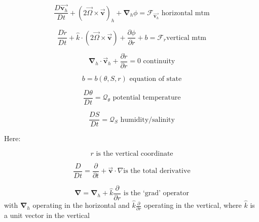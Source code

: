 

\begin{equation*}
\frac{D\vec{\mathbf{v}_{h}}}{Dt}+\left( 2\vec{\Omega}\times \vec{\mathbf{v}}
\right) _{h}+\mathbf{\nabla }_{h}\phi =\mathcal{F}_{\vec{\mathbf{v}_{h}}}
\text{ horizontal mtm} \label{eq:horizontal_mtm}
\end{equation*}

\begin{equation}
\frac{D\dot{r}}{Dt}+\widehat{k}\cdot \left( 2\vec{\Omega}\times \vec{\mathbf{
v}}\right) +\frac{\partial \phi }{\partial r}+b=\mathcal{F}_{\dot{r}}\text{
vertical mtm} \label{eq:vertical_mtm}
\end{equation}

\begin{equation}
\mathbf{\nabla }_{h}\cdot \vec{\mathbf{v}}_{h}+\frac{\partial \dot{r}}{
\partial r}=0\text{ continuity}  \label{eq:continuity}
\end{equation}

\begin{equation}
b=b(\theta ,S,r)\text{ equation of state} \label{eq:equation_of_state}
\end{equation}

\begin{equation}
\frac{D\theta }{Dt}=\mathcal{Q}_{\theta }\text{ potential temperature}
\label{eq:potential_temperature}
\end{equation}

\begin{equation}
\frac{DS}{Dt}=\mathcal{Q}_{S}\text{ humidity/salinity}
\label{eq:humidity_salt}
\end{equation}

Here:

\begin{equation*}
r\text{ is the vertical coordinate}
\end{equation*}

\begin{equation*}
\frac{D}{Dt}=\frac{\partial }{\partial t}+\vec{\mathbf{v}}\cdot \nabla \text{
is the total derivative}
\end{equation*}

\begin{equation*}
\mathbf{\nabla }=\mathbf{\nabla }_{h}+\widehat{k}\frac{\partial }{\partial r}
\text{ is the `grad' operator}
\end{equation*}
with $\mathbf{\nabla }_{h}$ operating in the horizontal and $\widehat{k}
\frac{\partial }{\partial r}$ operating in the vertical, where $\widehat{k}$
is a unit vector in the vertical

